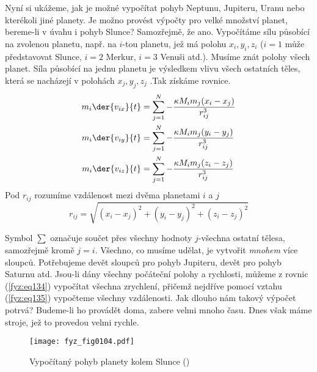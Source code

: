     Nyní si ukážeme, jak je možné vypočítat pohyb Neptunu, Jupiteru, Uranu nebo kterékoli jiné 
    planety. Je možno provést výpočty pro velké množství planet, bereme-li v úvahu i pohyb Slunce? 
    Samozřejmě, že ano. Vypočítáme sílu působící na zvolenou planetu, např. na \(i\)-tou planetu, 
    jež má polohu \(x_i, y_i, z_i\) (\(i = 1\) může představovat Slunce, \(i = 2\) Merkur, \(i = 
    3\) Venuši atd.). Musíme znát polohy všech planet. Síla působící na jednu planetu je výsledkem 
    vlivu všech ostatních těles, která se nacházejí v polohách \(x_j, y_j, z_j\) .Tak získáme 
    rovnice.
    \begin{subequations}
      \label{fyz:eq134}
      \begin{align}
        m_i\der{v_{ix}}{t} 
          &= \sum_{j=1}^N - \frac{\kappa M_im_j(x_i - x_j)}{r_{ij}^3}  \label{fyz:eq134a}  \\
        m_i\der{v_{iy}}{t} 
          &= \sum_{j=1}^N - \frac{\kappa M_im_j(y_i - y_j)}{r_{ij}^3}  \label{fyz:eq134b}  \\
        m_i\der{v_{iz}}{t} 
          &= \sum_{j=1}^N - \frac{\kappa M_im_j(z_i - z_j)}{r_{ij}^3}  \label{fyz:eq134c}  
      \end{align}
    \end{subequations}
    Pod \(r_{ij}\) rozumíme vzdálenost mezi dvěma planetami \(i\) a \(j\)
    \begin{equation}\label{fyz:eq135}
      r_{ij} = \sqrt{(x_i-x_j)^2 + (y_i-y_j)^2 + (z_i-z_j)^2}
    \end{equation}
    
    Symbol \(\sum\) označuje součet přes všechny hodnoty \(j\)-všechna ostatní tělesa, samozřejmě 
    kromě \(j = i\). Všechno, co musíme udělat, je vytvořit \emph{mnohem} více sloupců. Potřebujeme 
    devět sloupců pro pohyb Jupiteru, devět pro pohyb Saturnu atd. Jsou-li dány všechny počáteční 
    polohy a rychlosti, můžeme z rovnic (\ref{fyz:eq134}) vypočítat všechna zrychlení, přičemž 
    nejdříve pomocí vztahu (\ref{fyz:eq135}) vypočteme všechny vzdálenosti. Jak dlouho nám takový 
    výpočet potrvá? Budeme-li ho provádět doma, zabere velmi mnoho času. Dnes však máme stroje, jež 
    to provedou velmi rychle.
    
    \begin{figure}[ht!]  %
      \centering
      \texttt{[image: fyz\_fig0104.pdf]}
      \caption{Vypočítaný pohyb planety kolem Slunce (\cite[s.~134]{Feynman01})}
      \label{fyz:fig0104}
    \end{figure}
    
